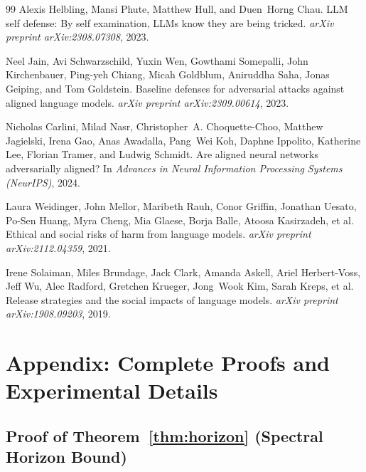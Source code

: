 \documentclass[10pt,twocolumn]{article}
\begin{document}
\begin{thebibliography}{99}
Alexis Helbling, Mansi Phute, Matthew Hull, and Duen~Horng Chau.
\newblock LLM self defense: By self examination, LLMs know they are being tricked.
\newblock \emph{arXiv preprint arXiv:2308.07308}, 2023.

Neel Jain, Avi Schwarzschild, Yuxin Wen, Gowthami Somepalli, John Kirchenbauer, Ping-yeh Chiang, Micah Goldblum, Aniruddha Saha, Jonas Geiping, and Tom Goldstein.
\newblock Baseline defenses for adversarial attacks against aligned language models.
\newblock \emph{arXiv preprint arXiv:2309.00614}, 2023.

Nicholas Carlini, Milad Nasr, Christopher~A. Choquette-Choo, Matthew Jagielski, Irena Gao, Anas Awadalla, Pang~Wei Koh, Daphne Ippolito, Katherine Lee, Florian Tramer, and Ludwig Schmidt.
\newblock Are aligned neural networks adversarially aligned?
\newblock In \emph{Advances in Neural Information Processing Systems (NeurIPS)}, 2024.

Laura Weidinger, John Mellor, Maribeth Rauh, Conor Griffin, Jonathan Uesato, Po-Sen Huang, Myra Cheng, Mia Glaese, Borja Balle, Atoosa Kasirzadeh, et al.
\newblock Ethical and social risks of harm from language models.
\newblock \emph{arXiv preprint arXiv:2112.04359}, 2021.

Irene Solaiman, Miles Brundage, Jack Clark, Amanda Askell, Ariel Herbert-Voss, Jeff Wu, Alec Radford, Gretchen Krueger, Jong~Wook Kim, Sarah Kreps, et al.
\newblock Release strategies and the social impacts of language models.
\newblock \emph{arXiv preprint arXiv:1908.09203}, 2019.

\end{thebibliography}


\appendix
\section{Appendix: Complete Proofs and Experimental Details}
\label{sec:appendix}

\subsection{Proof of Theorem~\ref{thm:horizon} (Spectral Horizon Bound)}
\label{proof:horizon}
\end{document}
